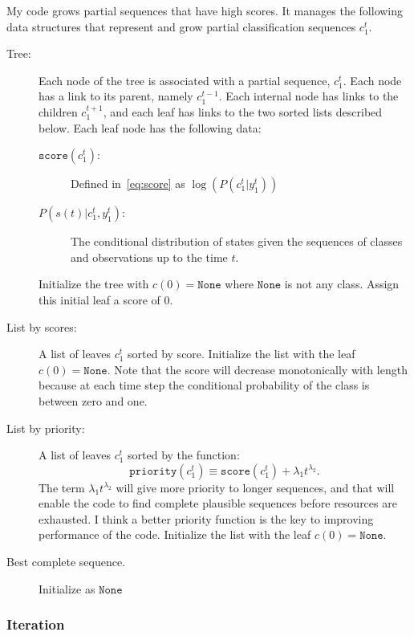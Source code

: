 \documentclass[]{article}
\newcommand{\ts}[3]{#1_{#2}^{#3}}                    %
\newcommand{\ti}[2]{{#1}{(#2)}}                  %
\begin{document}
My code grows partial sequences that have high scores.  It manages the
following data structures that represent and grow partial
classification sequences $\ts{c}{1}{t}$.
\begin{description}
\item[Tree:] Each node of the tree is associated with a partial
  sequence, $\ts{c}{1}{t}$.  Each node has a link to its parent,
  namely $\ts{c}{1}{t-1}$.  Each internal node has links to the
  children $\ts{c}{1}{t+1}$, and each leaf has links to the two sorted
  lists described below.  Each leaf node has the following data:
  \begin{description}
  \item[$\mathtt{score}\left(\ts{c}{1}{t} \right)$:] Defined
    in~\eqref{eq:score} as
    $\log\left( P\left(\ts{c}{1}{t}|\ts{y}{1}{t}\right) \right)$
  \item[$P\left(\ti{s}{t}|\ts{c}{1}{t}, \ts{y}{1}{t}\right)$:]  The
    conditional distribution of states given the sequences of classes
    and observations up to the time $t$.
  \end{description}
Initialize the
  tree with $\ti{c}{0} = \mathtt{None}$ where $\mathtt{None}$ is not
  any class.  Assign this initial leaf a score of $0$.
\item[List by scores:] A list of leaves $\ts{c}{1}{t}$ sorted by
  score.  Initialize the list with the leaf
  $\ti{c}{0} = \mathtt{None}$.  Note that the score will decrease
  monotonically with length because at each time step the conditional
  probability of the class is between zero and one.
\item[List by priority:] A list of leaves $\ts{c}{1}{t}$ sorted by the
  function:
  \begin{equation}
    \label{eq:priority}
    \mathtt{priority}\left(\ts{c}{1}{t} \right) \equiv
    \mathtt{score}\left(\ts{c}{1}{t} \right) + \lambda_1 t^{\lambda_2}.
  \end{equation}
  The term $\lambda_1 t^{\lambda_2}$ will give more priority to longer
  sequences, and that will enable the code to find complete plausible
  sequences before resources are exhausted.  I think a better priority
  function is the key to improving performance of the code.
  Initialize the list with the leaf $\ti{c}{0} = \mathtt{None}$.
\item[Best complete sequence.] Initialize as $\mathtt{None}$
\end{description}

\subsubsection{Iteration}\label{iteration}
\end{document}
